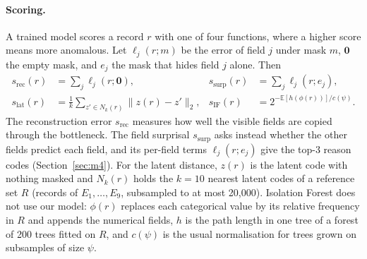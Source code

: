 \documentclass{article} %
\begin{document}
\paragraph{Scoring.}
A trained model scores a record $r$ with one of four functions, where a higher
score means more anomalous. Let $\ell_j(r; m)$ be the error of field $j$ under
mask $m$, $\mathbf{0}$ the empty mask, and $e_j$ the mask that hides field $j$
alone. Then
\begin{align}
s_{\text{rec}}(r) &= \sum_{j} \ell_j(r; \mathbf{0}), &
s_{\text{surp}}(r) &= \sum_{j} \ell_j(r; e_j), \label{eq:score-model}\\
s_{\text{lat}}(r) &= \frac{1}{k}\sum_{z'\in N_k(r)} \lVert z(r) - z'\rVert_2, &
s_{\text{IF}}(r) &= 2^{-\mathbb{E}[h(\phi(r))]/c(\psi)}. \label{eq:score-ref}
\end{align}
The reconstruction error $s_{\text{rec}}$ measures how well the visible fields
are copied through the bottleneck. The field surprisal $s_{\text{surp}}$ asks
instead whether the other fields predict each field, and its per-field terms
$\ell_j(r; e_j)$ give the top-3 reason codes (Section~\ref{sec:m4}). For the
latent distance, $z(r)$ is the latent code with nothing masked and $N_k(r)$ holds
the $k = 10$ nearest latent codes of a reference set $R$ (records of
$E_1,\dots,E_9$, subsampled to at most 20{,}000). Isolation Forest
\citep{liu2008isolation} does not use our model: $\phi(r)$ replaces each
categorical value by its relative frequency in $R$ and appends the numerical
fields, $h$ is the path length in one tree of a forest of 200 trees fitted on
$R$, and $c(\psi)$ is the usual normalisation for trees grown on subsamples of
size $\psi$.
\end{document}
